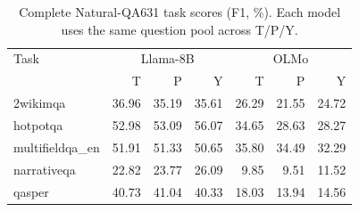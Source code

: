 \begin{table}[ht]
\centering\small
\caption{Complete Natural-QA631 task scores (F1, \%). Each model uses the same question pool across T/P/Y.}
\label{tab:natural-three-tasks}
\begin{tabular}{@{}lrrrrrr@{}}
\toprule
Task & \multicolumn{3}{c}{Llama-8B} & \multicolumn{3}{c}{OLMo} \\
 & T & P & Y & T & P & Y \\
\midrule
2wikimqa & 36.96 & 35.19 & 35.61 & 26.29 & 21.55 & 24.72 \\
hotpotqa & 52.98 & 53.09 & 56.07 & 34.65 & 28.63 & 28.27 \\
multifieldqa\_en & 51.91 & 51.33 & 50.65 & 35.80 & 34.49 & 32.29 \\
narrativeqa & 22.82 & 23.77 & 26.09 & 9.85 & 9.51 & 11.52 \\
qasper & 40.73 & 41.04 & 40.33 & 18.03 & 13.94 & 14.56 \\
\bottomrule
\end{tabular}
\end{table}
